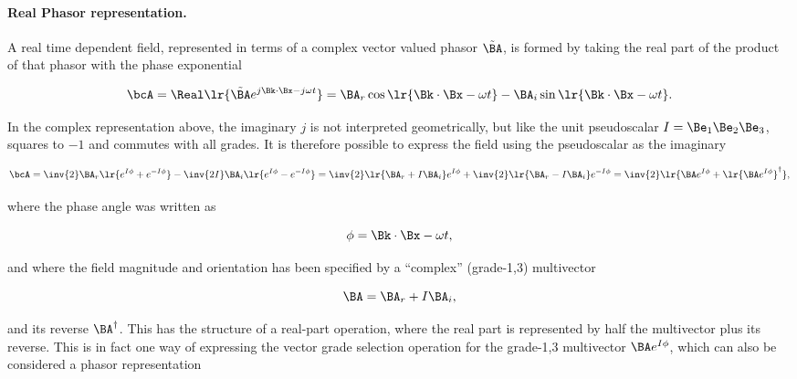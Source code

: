 %
%
\paragraph{Real Phasor representation.}

A real time dependent field, represented in terms of a complex vector valued phasor \( \tilde{\BA} \), is formed by taking the real part of the product of that phasor with the phase exponential

\begin{dmath}\label{eqn:ellipticalWaves:20}
\bcA
= \Real\lr{ \tilde{\BA} e^{j \Bk \cdot \Bx -j \omega t} }
=
\BA_r \cos\lr{ \Bk \cdot \Bx - \omega t }
- \BA_i \sin\lr{ \Bk \cdot \Bx - \omega t }.
\end{dmath}

In the complex representation above, the imaginary \( j \) is not interpreted geometrically, but like the unit pseudoscalar \( I = \Be_1 \Be_2 \Be_3 \), squares to \( -1 \) and commutes with all grades.  It is therefore possible to express the field using the pseudoscalar as the imaginary

\begin{dmath}\label{eqn:ellipticalWaves:40}
\bcA
=
\inv{2} \BA_r
\lr{ e^{I \phi} + e^{-I\phi} }
   - \inv{2 I} \BA_i
   \lr{ e^{I \phi} - e^{-I\phi} }
=
\inv{2}\lr{ \BA_r + I \BA_i } e^{I \phi}
+
\inv{2}\lr{ \BA_r - I \BA_i } e^{-I \phi}
=
\inv{2} \lr{ \BA e^{I \phi} + \lr{ \BA e^{I \phi} }^\dagger }
,
\end{dmath}

where the phase angle was written as

\begin{dmath}\label{eqn:ellipticalWaves:400}
\phi = \Bk \cdot \Bx - \omega t,
\end{dmath}

and where the field magnitude and orientation has been specified by a ``complex'' (grade-1,3) multivector

\begin{dmath}\label{eqn:ellipticalWaves:120}
\BA = \BA_r + I \BA_i,
\end{dmath}

and its reverse \( \BA^\dagger \).
This has the structure of a real-part operation, where the real part is represented by half the multivector plus its reverse.  This is in fact one way of expressing the vector grade selection operation for the grade-1,3 multivector \( \BA e^{I\phi} \), which can also be considered a phasor representation


